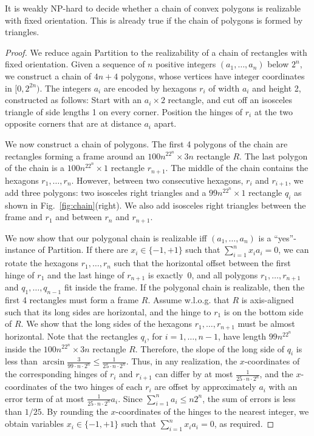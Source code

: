 \documentclass[runningheads]{article}
\begin{document}
\begin{theorem}\label{thm:path2}
It is weakly NP-hard to decide whether a chain of convex polygons is realizable with fixed orientation. This is already true if the chain of polygons is formed by triangles.
\end{theorem}
\begin{proof}
We reduce again {\sc Partition} to the realizability of a chain of rectangles with fixed orientation.
Given a sequence of $n$ positive integers $(a_1,\ldots , a_n)$ below $2^n$, we construct
a chain of $4n+4$ polygons, whose vertices have integer coordinates in  $[0,2^{2n})$. The integers $a_i$ are encoded by hexagons $r_i$ of width $a_i$ and height 2, constructed as follows: Start with an $a_i\times 2$ rectangle, and cut off an isosceles triangle of side lengths 1 on every corner. Position the hinges of $r_i$ at the two opposite corners that are at distance $a_i$ apart.

We now construct a chain of polygons. The first 4 polygons of the chain are rectangles forming a frame around an $100n^22^n\times 3n$ rectangle $R$. The last polygon of the chain is a $100n^22^n\times 1$ rectangle $r_{n+1}$. The middle of the chain contains the hexagons $r_1,\ldots , r_n$. However, between two consecutive hexagons, $r_i$ and $r_{i+1}$, we add three polygons: two isosceles right triangles and a $99n^22^n\times 1$ rectangle $q_i$ as shown in Fig.~\ref{fig:chain}(right). We also add isosceles right triangles between the frame and $r_1$ and between $r_n$ and $r_{n+1}$.

We now show that our polygonal chain is realizable iff $(a_1,\ldots , a_n)$ is a ``yes''-instance of {\sc Partition}. If there are $x_i\in \{-1,+1\}$ such that $\sum_{i=1}^n x_ia_i=0$, we can rotate the hexagons $r_1,\ldots ,r_n$ such that the horizontal offset between the first hinge of $r_1$ and the last hinge of $r_{n+1}$ is exactly~0, and all polygons $r_1,\ldots, r_{n+1}$ and $q_1,\ldots, q_{n-1}$ fit inside the frame.
%
If the polygonal chain is realizable, then the first 4 rectangles must form a frame $R$. Assume w.l.o.g. that $R$ is axis-aligned such that its long sides are horizontal, and the hinge to $r_1$ is on the bottom side of $R$.
We show that the long sides of the hexagons $r_1,\ldots , r_{n+1}$ must be almost horizontal. Note that the rectangles $q_i$, for $i=1,\ldots , n-1$, have length $99n^22^n$ inside the $100n^22^n\times 3n$ rectangle $R$. Therefore, the slope of the long side of $q_i$ is less than $\arcsin \frac{3}{99\cdot n\cdot 2^n}\leq \frac{1}{25\cdot n \cdot 2^n}$. Thus, in any realization, the $x$-coordinates of the corresponding hinges of $r_i$ and $r_{i+1}$ can differ by at most $\frac{1}{25\cdot n \cdot 2^n}$, and the $x$-coordinates of the two hinges of each $r_i$ are offset by approximately $a_i$ with an error term of at most $\frac{1}{25\cdot n \cdot 2^n}a_i$. Since $\sum_{i=1}^na_i\leq n2^n$, the sum of errors is less than $1/25$. By rounding the $x$-coordinates of the hinges to the nearest integer, we obtain variables $x_i\in \{-1,+1\}$ such that $\sum_{i=1}^n x_ia_i=0$, as required.




\end{proof}
\end{document}
